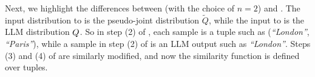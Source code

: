Next, we highlight the differences between  (with the choice of $n=2$) and . The input distribution to  is the pseudo-joint distribution $\widetilde Q$, while the input to  is the LLM distribution $Q$. So in step (2) of , each sample is a tuple such as (\textit{``London''}, \textit{``Paris''}), while a sample in step (2) of  is an LLM  output such as \textit{``London''}. Steps (3) and (4) of  are similarly modified, and now the similarity function is defined over tuples.   
